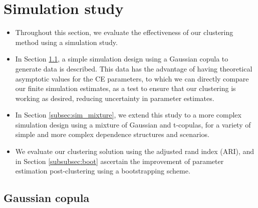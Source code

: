 \documentclass{article}
\numberwithin{equation}{section}
\begin{document}
\section{Simulation study} \label{sec:sim}

\begin{itemize}
  \item Throughout this section, we evaluate the effectiveness of our clustering method using a simulation study.
  \item In Section \ref{subsec:sim_gauss}, a simple simulation design using a Gaussian copula to generate data is described. 
  This data has the advantage of having theoretical asymptotic values for the CE parameters, to which we can directly compare our finite simulation estimates, as a test to ensure that our clustering is working as desired, reducing uncertainty in parameter estimates. 
  \item In Section \ref{subsec:sim_mixture}, we extend this study to a more complex simulation design using a mixture of Gaussian and t-copulas, for a variety of simple and more complex dependence structures and scenarios. 
  \item We evaluate our clustering solution using the adjusted rand index (ARI), and in Section \ref{subsubsec:boot} ascertain the improvement of parameter estimation post-clustering using a bootstrapping scheme. 
\end{itemize}

\subsection{Gaussian copula} \label{subsec:sim_gauss}
\end{document}

